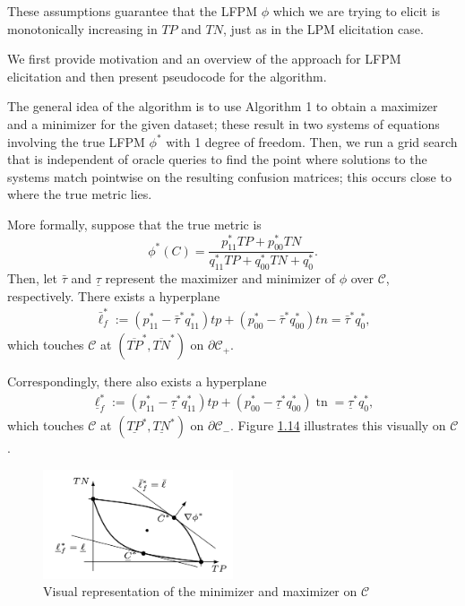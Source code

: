 \documentclass[
  letterpaper,
  DIV=11,
  numbers=noendperiod,
  oneside]{scrreprt}
\theoremstyle{remark}
\begin{document}
These assumptions guarantee that the LFPM \(\phi\) which we are trying
to elicit is monotonically increasing in \(TP\) and \(TN\), just as in
the LPM elicitation case.

We first provide motivation and an overview of the approach for LFPM
elicitation and then present pseudocode for the algorithm.

The general idea of the algorithm is to use Algorithm 1 to obtain a
maximizer and a minimizer for the given dataset; these result in two
systems of equations involving the true LFPM \(\phi^*\) with 1 degree of
freedom. Then, we run a grid search that is independent of oracle
queries to find the point where solutions to the systems match pointwise
on the resulting confusion matrices; this occurs close to where the true
metric lies.

More formally, suppose that the true metric is
\[\phi^{*}(C)=\frac{p_{11}^{*} T P+p_{00}^{*} T N}{q_{11}^{*} T P+q_{00}^{*} T N+q_{0}^{*}}.\]
Then, let \(\bar{\tau}\) and \(\underline{\tau}\) represent the
maximizer and minimizer of \(\phi\) over \(\mathcal{C}\), respectively.
There exists a hyperplane \[\begin{aligned}
\bar{\ell}_{f}^{*}:=\left(p_{11}^{*}-\bar{\tau}^{*} q_{11}^{*}\right) t p+\left(p_{00}^{*}-\bar{\tau}^{*} q_{00}^{*}\right) t n=\bar{\tau}^{*} q_{0}^{*},
\end{aligned}\] which touches \(\mathcal{C}\) at
\(\left(\overline{T P}^{*}, \overline{T N}^{*}\right)\) on
\(\partial \mathcal{C}_{+}\).

Correspondingly, there also exists a hyperplane \[\begin{aligned}
\underline{\ell}_{f}^{*}:=\left(p_{11}^{*}-\underline{\tau}^{*} q_{11}^{*}\right) t p+\left(p_{00}^{*}-\underline{\tau}^{*} q_{00}^{*}\right) \operatorname{tn}=\underline{\tau}^{*} q_{0}^{*},
\end{aligned}\] which touches \(\mathcal{C}\) at
\(\left(\underline{TP}^{*}, \underline{T N}^{*}\right)\) on
\(\partial \mathcal{C}_{-}\). Figure \hyperref[minmax]{1.14} illustrates
this visually on \(\mathcal{C}\).

\begin{figure}

{\centering \includegraphics[width=0.5\textwidth,height=\textheight]{Figures/Screenshot 2023-11-13 at 6.56.52 PM.png}

}

\caption{Visual representation of the minimizer and maximizer on
\(\mathcal{C}\)}

\end{figure}%
\end{document}

